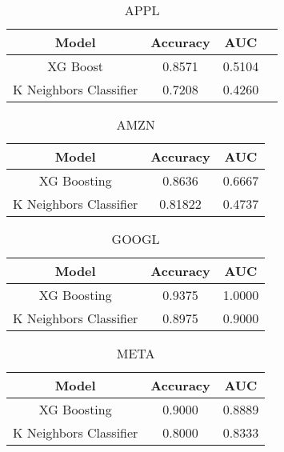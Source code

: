 \documentclass{article}
\title{}
\author{}
\date{}
\begin{document}
\maketitle

\begin{table}[h]
\centering
\begin{tabular}{cccc}
\hline
\textbf{Model} & \textbf{Accuracy} & \textbf{AUC}  \\ \hline
XG Boost &    0.8571 & 0.5104 \\
K Neighbors Classifier &    0.7208	 & 0.4260 \\\hline
\end{tabular}
\caption{APPL}
\end{table}

\begin{table}[h]
\centering
\begin{tabular}{ccc}
\hline
\textbf{Model} & \textbf{Accuracy} & \textbf{AUC} \\ \hline
XG Boosting & 0.8636 &0.6667 \\
K Neighbors Classifier & 0.81822 & 0.4737	 \\ \hline
\end{tabular}
\caption{AMZN}
\end{table}

\begin{table}[h]
\centering
\begin{tabular}{ccc}
\hline
\textbf{Model} & \textbf{Accuracy} & \textbf{AUC} \\ \hline
XG Boosting & 0.9375 & 1.0000 \\
K Neighbors Classifier & 0.8975 & 0.9000 \\ \hline
\end{tabular}
\caption{GOOGL}
\end{table}
\begin{table}[h]
\centering
\begin{tabular}{ccc}
\hline
\textbf{Model} & \textbf{Accuracy} & \textbf{AUC} \\ \hline
XG Boosting & 0.9000  & 0.8889 \\
K Neighbors Classifier & 0.8000 & 0.8333 \\ \hline
\end{tabular}
\caption{META}
\end{table}
\end{document}
